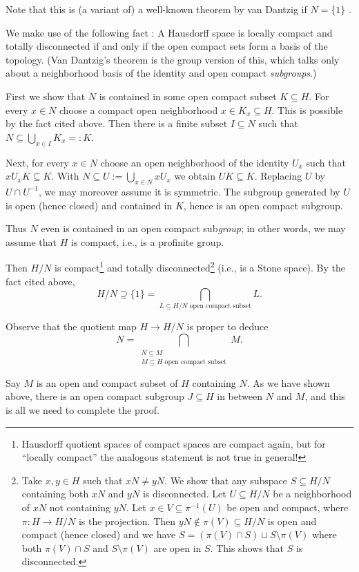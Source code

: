 \documentclass[a4paper]{scrartcl} %
\numberwithin{equation}{section}
\begin{document}
Note that this is (a variant of) a well-known theorem by van Dantzig if $N=\{1\}$ \cite{vandantzig}.

\begin{Proof}
  We make use of the following fact \cite[Prop.~3.1.7]{arhangel}: A Hausdorff space is locally compact and totally disconnected if and only if the open compact sets form a basis of the topology. (Van Dantzig's theorem is the group version of this, which talks only about a neighborhood basis of the identity and open compact \emph{subgroups}.)

  First we show that $N$ is contained in some open compact subset $K\subseteq H$. For every $x\in N$ choose a compact open neighborhood $x\in K_x\subseteq H$. This is possible by the fact cited above. Then there is a finite subset $I\subseteq N$ such that $N\subseteq \bigcup_{x\in I}K_x=:K$.

  Next, for every $x\in N$ choose an open neighborhood of the identity $U_x$ such that $xU_xK\subseteq K$.  With $N\subseteq U:=\bigcup_{x\in N}xU_x$ we obtain $UK\subseteq K$. Replacing $U$ by $U\cap U^{-1}$, we may moreover assume it is symmetric. The subgroup generated by $U$ is open (hence closed) and contained in $K$, hence is an open compact subgroup.

  Thus $N$ even is contained in an open compact sub\emph{group}; in other words, we may assume that $H$ is compact, i.e., is a profinite group.

  Then $H/N$ is compact\footnote{Hausdorff quotient spaces of compact spaces are compact again, but for ``locally compact'' the analogous statement is not true in general!} and totally disconnected\footnote{Take $x,y\in H$ such that $xN\ne yN$. We show that any subspace $S\subseteq H/N$ containing both $xN$ and $yN$ is disconnected. Let $U\subseteq H/N$ be a neighborhood of $xN$ not containing $yN$. Let $x\in V\subseteq \pi^{-1}(U)$ be open and compact, where $\pi\colon H\to H/N$ is the projection. Then $yN\notin \pi(V)\subseteq H/N$ is open and compact (hence closed) and we have $S=(\pi(V)\cap S)\sqcup S\setminus \pi(V)$ where both $\pi(V)\cap S$ and $S\setminus\pi(V)$ are open in $S$. This shows that $S$ is disconnected.} (i.e., is a Stone space). By the fact cited above,
  \begin{equation*}
    H/N \supseteq\{1\} = \bigcap_{L\subseteq H/N\text{ open compact subset}} L.
  \end{equation*}

  Observe that the quotient map $H\to H/N$ is proper to deduce
  \begin{equation*}
    N = \bigcap_{\substack{N\subseteq M\\M\subseteq H\text{ open compact subset}}} M.
  \end{equation*}

  Say $M$ is an open and compact subset of $H$ containing $N$.  As we have shown above, there is an open compact subgroup $J\subseteq H$ in between $N$ and $M$, and this is all we need to complete the proof.
\end{Proof}
\end{document}

